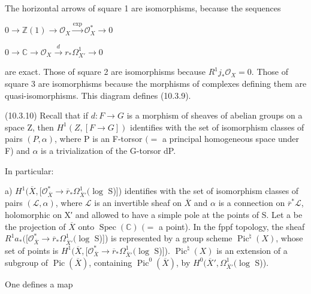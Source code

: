 \documentclass[11pt,twoside]{article}
\newcommand{\DFormula}[1]{%
  \par\smallskip\noindent\hspace*{0pt}\(\displaystyle #1\)\par\smallskip
}
\begin{document}
The horizontal arrows of square 1 are isomorphisms, because the sequences\par
\par\medskip
\DFormula{0\to \mathbb{Z}(1)\to \mathcal{O}_{X}\xrightarrow{\operatorname{exp}}\mathcal{O}_{X}^{\ast }\to 0}
\par\medskip
\DFormula{0\to \mathbb{C}\to \mathcal{O}_{X}\xrightarrow{d}r_{\ast }\Omega ^{1}_{X′}\to 0}
\par\medskip
are exact. Those of square 2 are isomorphisms because \(R^{1}j_{\ast }\mathcal{O}_{X}=0\). Those of square 3 are isomorphisms because the morphisms of complexes defining them are quasi-isomorphisms. This diagram defines (10.3.9).\par
\par\medskip
(10.3.10) Recall that if \(d:F\to G\) is a morphism of sheaves of abelian groups on a space Z, then \(H^{1}(Z,[F\to G])\) identifies with the set of isomorphism classes of pairs \((P,\alpha )\), where P is an F-torsor \((=\) a principal homogeneous space under F) and \(\alpha \) is a trivialization of the G-torsor dP.\par
\par\medskip
In particular:\par
\par\medskip
a) \(H^{1}(\overline{X},[\mathcal{O}_{\overline{X}}^{\ast }\to \overline{r}_{\ast }\Omega ^{1}_{\overline{X}′}(\operatorname{log}\) S)]) identifies with the set of isomorphism classes of pairs \((\mathcal{L},\alpha )\), where \(\mathcal{L}\) is an invertible sheaf on \(\overline{X}\) and \(\alpha \) is a connection on \(\overline{r}^{\ast }\mathcal{L}\), holomorphic on X′ and allowed to have a simple pole at the points of S. Let a be the projection of \(\overline{X}\) onto \(\operatorname{Spec}(\mathbb{C})\) \((=\) a point). In the fppf topology, the sheaf \(R^{1}a_{\ast }([\mathcal{O}_{\overline{X}}^{\ast }\to \overline{r}_{\ast }\Omega ^{1}_{\overline{X}′}(\operatorname{log}\) S)]) is represented by a group scheme \(\operatorname{Pic}^{\natural }(X)\), whose set of points is \(H^{1}(\overline{X},[\mathcal{O}_{\overline{X}}^{\ast }\to \overline{r}_{\ast }\Omega ^{1}_{\overline{X}′}(\operatorname{log}\) S)]). \(\operatorname{Pic}^{\natural }(X)\) is an extension of a subgroup of \(\operatorname{Pic}(\overline{X})\), containing \(\operatorname{Pic}^{0}(\overline{X})\), by \(H^{0}(\overline{X}′,\Omega ^{1}_{\overline{X}′}(\operatorname{log}\) S)).\par
\par\medskip
One defines a map\par
\end{document}
